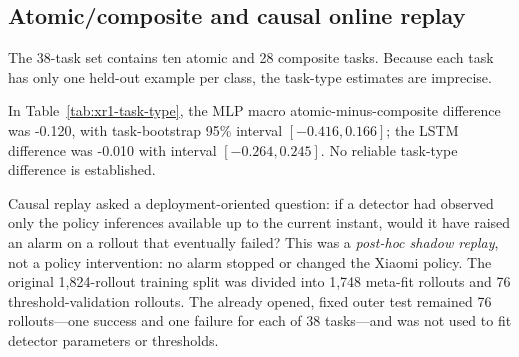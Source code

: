 \documentclass[11pt,a4paper]{article}
\begin{document}
\subsection{Atomic/composite and causal online replay}
The 38-task set contains ten atomic and 28 composite tasks. Because each task
has only one held-out example per class, the task-type estimates are imprecise.

\begin{table}[H]
\centering
\caption{Atomic versus composite outer-test results.}
\label{tab:xr1-task-type}
\end{table}

In Table~\ref{tab:xr1-task-type}, the MLP macro atomic-minus-composite difference was -0.120, with task-bootstrap
95\% interval $[-0.416,0.166]$; the LSTM difference was -0.010 with interval
$[-0.264,0.245]$. No reliable task-type difference is established.

Causal replay asked a deployment-oriented question: if a detector had observed
only the policy inferences available up to the current instant, would it have
raised an alarm on a rollout that eventually failed? This was a \emph{post-hoc
shadow replay}, not a policy intervention: no alarm stopped or changed the
Xiaomi policy. The original 1,824-rollout training split was divided into 1,748
meta-fit rollouts and 76 threshold-validation rollouts. The already opened,
fixed outer test remained 76 rollouts---one success and one failure for each of
38 tasks---and was not used to fit detector parameters or thresholds.
\end{document}
